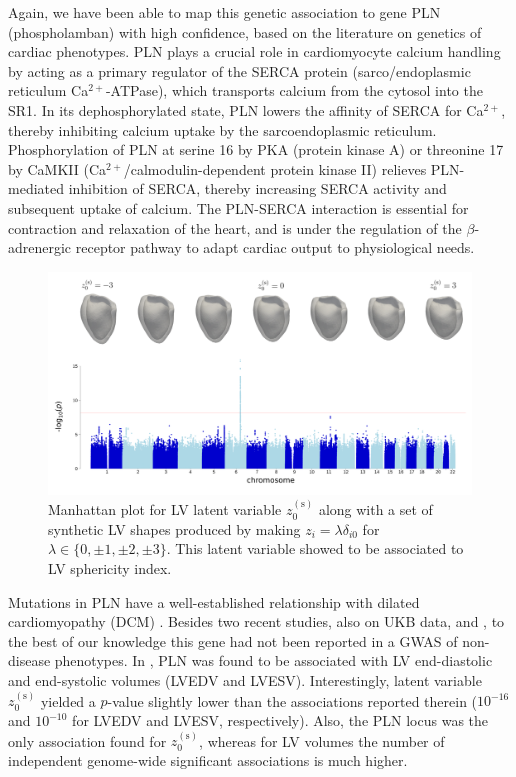 Again, we have been able to map this genetic association to gene PLN (phospholamban) with high confidence, based on the literature on genetics of cardiac phenotypes.
PLN plays a crucial role in cardiomyocyte calcium handling by acting as a primary regulator of the SERCA protein (sarco/endoplasmic reticulum Ca$^{2+}$-ATPase), which transports calcium from the cytosol into the SR1. In its dephosphorylated state, PLN lowers the affinity of SERCA for Ca$^{2+}$, thereby inhibiting calcium uptake by the sarcoendoplasmic reticulum. Phosphorylation of PLN at serine 16 by PKA (protein kinase A) or threonine 17 by CaMKII (Ca$^{2+}$/calmodulin-dependent protein kinase II) relieves PLN-mediated inhibition of SERCA, thereby increasing SERCA activity and subsequent uptake of calcium. The PLN-SERCA interaction is essential for contraction and relaxation of the heart, and is under the regulation of the $\beta$-adrenergic receptor pathway to adapt cardiac output to physiological needs. \cite{maclennan_2003}

\begin{figure}[ht!]
\includegraphics[width=\textwidth]{figs/gwas/GWAS_Experiment1_z0s_scaled_meshes.png}
\caption{Manhattan plot for LV latent variable $z_0^{(\text{s})}$ along with a set of synthetic LV shapes produced by making $z_i=\lambda \delta_{i0}$ for $\lambda\in\{0, \pm 1, \pm 2, \pm 3\}$. This latent variable showed to be associated to LV sphericity index.}
\label{fig:manhattan_LV_latent}
\end{figure}

Mutations in PLN have a well-established relationship with dilated cardiomyopathy (DCM) \cite{ref_Eijgenraam}. Besides two recent studies, also on UKB data, \cite{ref_pirruccello} and \cite{ref_fractal_dim}, to the best of our knowledge this gene had not been reported in a GWAS of non-disease phenotypes. In \cite{ref_pirruccello}, PLN was found to be associated with LV end-diastolic and end-systolic volumes (LVEDV and LVESV). Interestingly, latent variable $z_0^{(\text{s})}$ yielded a $p$-value slightly lower than the associations reported therein ($10^{-16}$ and $10^{-10}$ for LVEDV and LVESV, respectively). Also, the PLN locus was the only association found for $z_0^{(\text{s})}$, whereas for LV volumes the number of independent genome-wide significant associations is much higher. 

